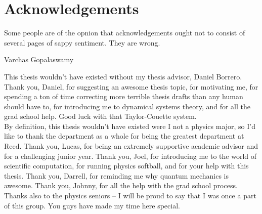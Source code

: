     \chapter*{Acknowledgements}
	\epigraph{Some people are of the opnion that acknowledgements ought not to consist of several pages of sappy sentiment. They are wrong.}{Varchas Gopalaswamy}

This thesis wouldn't have existed without my thesis advisor, Daniel Borrero. Thank you, Daniel, for suggesting an awesome thesis topic, for motivating me, for spending a ton of time correcting more terrible thesis drafts than any human should have to, for introducing me to dynamical systems theory, and for all the grad school help. Good luck with that Taylor-Couette system.\\

By definition, this thesis wouldn't have existed were I not a physics major, so I'd like to thank the department as a whole for being the greatest department at Reed. Thank you, Lucas, for being an extremely supportive academic advisor and for a  challenging junior year. Thank you, Joel, for introducing me to the world of scientific computation, for running physics softball, and for your help with this thesis. Thank you, Darrell, for reminding me why quantum mechanics is awesome. Thank you, Johnny, for all the help with the grad school process. Thanks also to the physics seniors -- I will be proud to say that I was once a part of this group. You guys have made my time here special. \\

